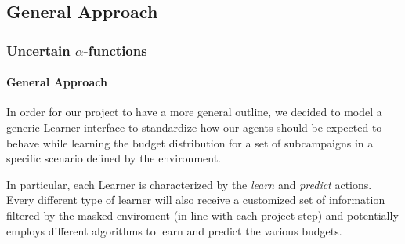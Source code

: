 \documentclass[11pt]{beamer}
\begin{document}

\subsection{General Approach}


\begin{frame}

\frametitle{Uncertain $\alpha$-functions}
\framesubtitle{General Approach}

In order for our project to have a more general outline, we decided to model a generic Learner interface to standardize how our agents should be expected to behave while learning the budget distribution for a set of subcampaigns in a specific scenario defined by the environment.

In particular, each Learner is characterized by the \textit{learn} and \textit{predict} actions.
Every different type of learner will also receive a customized set of information filtered by the masked enviroment (in line with each project step) and potentially employs different algorithms to learn and predict the various budgets.

\end{frame}

\end{document}
